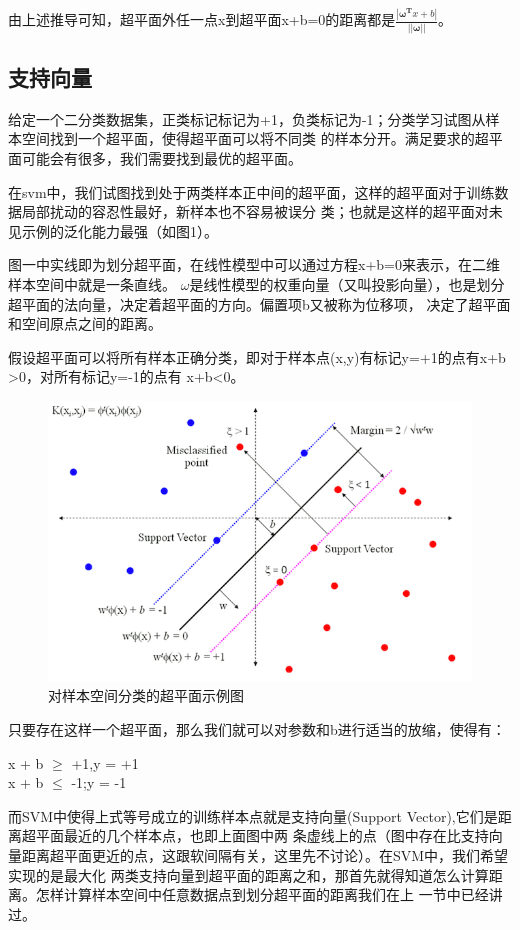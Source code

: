 \documentclass[UTF8]{ctexart}
\begin{document}
{由上述推导可知，超平面外任一点x到超平面x+b=0的距离都是$\frac{|\bm{\omega^T}x+b|}{||\bm{\omega}||}$。
\subsection{支持向量}
给定一个二分类数据集，正类标记标记为+1，负类标记为-1；分类学习试图从样本空间找到一个超平面，使得超平面可以将不同类
的样本分开。满足要求的超平面可能会有很多，我们需要找到最优的超平面。\par
在svm中，我们试图找到处于两类样本正中间的超平面，这样的超平面对于训练数据局部扰动的容忍性最好，新样本也不容易被误分
类；也就是这样的超平面对未见示例的泛化能力最强（如图1）。\par
图一中实线即为划分超平面，在线性模型中可以通过方程x+b=0来表示，在二维样本空间中就是一条直线。\bm
{$\omega$}是线性模型的权重向量（又叫投影向量），也是划分超平面的法向量，决定着超平面的方向。偏置项b又被称为位移项，
决定了超平面和空间原点之间的距离。\par
假设超平面可以将所有样本正确分类，即对于样本点(x,y)有标记y=+1的点有x+b\\>0，对所有标记y=-1的点有
x+b<0。

\begin{figure}[ht]
    \centering
    \includegraphics[scale=0.7]{71187447_p0.png}
    \caption{对样本空间分类的超平面示例图}
\end{figure}
只要存在这样一个超平面，那么我们就可以对参数\bm{$\omega$}和b进行适当的放缩，使得有：
\begin{center}
    {\Large {}x + b $\geq$ +1,y = +1\\[3ex]
            x + b $\leq$ -1;y = -1
    }
\end{center}\par
而SVM中使得上式等号成立的训练样本点就是支持向量(Support Vector),它们是距离超平面最近的几个样本点，也即上面图中两
条虚线上的点（图中存在比支持向量距离超平面更近的点，这跟软间隔有关，这里先不讨论）。在SVM中，我们希望实现的是最大化
两类支持向量到超平面的距离之和，那首先就得知道怎么计算距离。怎样计算样本空间中任意数据点到划分超平面的距离我们在上
一节中已经讲过。
}
\end{document}
